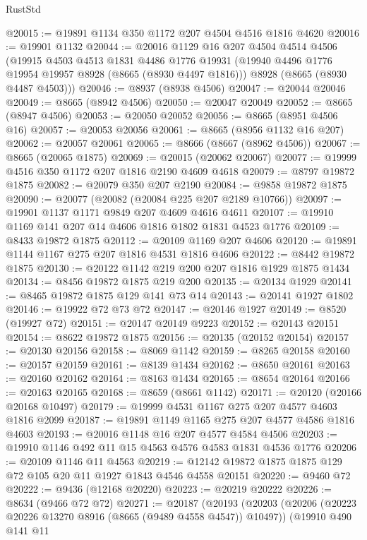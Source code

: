 \begin{lexlean}{RustStd}
\begin{coremodule}
@20015 := @19891 @1134 @350 @1172 @207 @4504 @4516 @1816 @4620
@20016 := @19901 @1132
@20044 := @20016
    @1129
    @16
    @207
    @4504
    @4514
    @4506
    (@19915
      @4503
      @4513
      @1831
      @4486
      @1776
      @19931
      (@19940 @4496 @1776 @19954 @19957 @8928 (@8665 (@8930 @4497 @1816)))
      @8928
      (@8665 (@8930 @4487 @4503)))
@20046 := @8937 (@8938 @4506)
@20047 := @20044 @20046
@20049 := @8665 (@8942 @4506)
@20050 := @20047 @20049
@20052 := @8665 (@8947 @4506)
@20053 := @20050 @20052
@20056 := @8665 (@8951 @4506 @16)
@20057 := @20053 @20056
@20061 := @8665 (@8956 @1132 @16 @207)
@20062 := @20057 @20061
@20065 := @8666 (@8667 (@8962 @4506))
@20067 := @8665 (@20065 @1875)
@20069 := @20015 (@20062 @20067)
@20077 := @19999 @4516 @350 @1172 @207 @1816 @2190 @4609 @4618
@20079 := @8797 @19872 @1875
@20082 := @20079 @350 @207 @2190
@20084 := @9858 @19872 @1875
@20090 := @20077 (@20082 (@20084 @225 @207 @2189 @10766))
@20097 := @19901 @1137 @1171 @9849 @207 @4609 @4616 @4611
@20107 := @19910 @1169 @141 @207 @14 @4606 @1816 @1802 @1831 @4523 @1776
@20109 := @8433 @19872 @1875
@20112 := @20109 @1169 @207 @4606
@20120 := @19891 @1144 @1167 @275 @207 @1816 @4531 @1816 @4606
@20122 := @8442 @19872 @1875
@20130 := @20122 @1142 @219 @200 @207 @1816 @1929 @1875 @1434
@20134 := @8456 @19872 @1875 @219 @200
@20135 := @20134 @1929
@20141 := @8465 @19872 @1875 @129 @141 @73 @14
@20143 := @20141 @1927 @1802
@20146 := @19922 @72 @73 @72
@20147 := @20146 @1927
@20149 := @8520 (@19927 @72)
@20151 := @20147 @20149 @9223
@20152 := @20143 @20151
@20154 := @8622 @19872 @1875
@20156 := @20135 (@20152 @20154)
@20157 := @20130 @20156
@20158 := @8069 @1142
@20159 := @8265 @20158
@20160 := @20157 @20159
@20161 := @8139 @1434
@20162 := @8650 @20161
@20163 := @20160 @20162
@20164 := @8163 @1434
@20165 := @8654 @20164
@20166 := @20163 @20165
@20168 := @8659 (@8661 @1142)
@20171 := @20120 (@20166 @20168 @10497)
@20179 := @19999 @4531 @1167 @275 @207 @4577 @4603 @1816 @2099
@20187 := @19891 @1149 @1165 @275 @207 @4577 @4586 @1816 @4603
@20193 := @20016 @1148 @16 @207 @4577 @4584 @4506
@20203 := @19910 @1146 @492 @11 @15 @4563 @4576 @4583 @1831 @4536 @1776
@20206 := @20109 @1146 @11 @4563
@20219 := @12142 @19872 @1875 @1875 @129 @72 @105 @20 @11 @1927 @1843 @4546 @4558 @20151
@20220 := @9460 @72
@20222 := @9436 (@12168 @20220)
@20223 := @20219 @20222
@20226 := @8634 (@9466 @72 @72)
@20271 := @20187
    (@20193
      (@20203
        (@20206 (@20223 @20226 @13270 @8916 (@8665 (@9489 @4558 @4547)) @10497))
        (@19910
          @490
          @141
          @11

\end{coremodule}
\end{lexlean}
